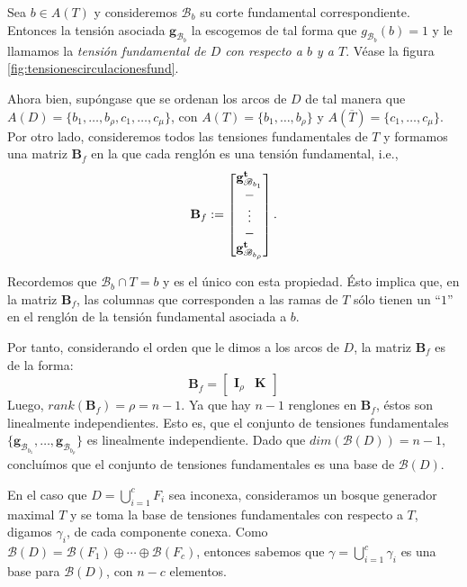 Sea $b \in A(T)$ y consideremos $\mathscr{B}_{b}$ su corte fundamental correspondiente. Entonces la tensión asociada $\mathbf{g}_{\mathscr{B}_{b}}$ la escogemos de tal forma que $g_{\mathscr{B}_{b}}(b) = 1$ y le llamamos la \textit{tensión fundamental de $D$ con respecto a $b$ y a $T$}. Véase la figura \ref{fig:tensionescirculacionesfund}.

Ahora bien, supóngase que se ordenan los arcos de $D$ de tal manera que $A(D) = \{b_{1}, \ldots, b_{\rho}, c_{1}, \ldots, c_{\mu}\}$, con $A(T) = \{b_{1}, \ldots, b_{\rho}\}$ y $A(\overline{T}) = \{c_{1}, \ldots, c_{\mu}\}$. Por otro lado, consideremos todos las tensiones fundamentales de $T$ y formamos una matriz $\mathbf{B}_{f}$ en la que cada renglón es una tensión fundamental, i.e., 
$$
\mathbf{B}_{f} := \begin{bmatrix}
\mathbf{g}_{\mathscr{B}_{b_{1}}}^{\mathbf{t}} \\
\-- \\
\vdots \\
\-- \\
\mathbf{g}_{\mathscr{B}_{b_{\rho}}}^{\mathbf{t}}
\end{bmatrix}.
$$

Recordemos que  $\mathscr{B}_{b} \cap T = b$ y es el único con esta propiedad. Ésto implica que, en la matriz $\mathbf{B}_{f}$, las columnas que corresponden a las ramas de $T$ sólo tienen un ``$1$'' en el renglón de la tensión fundamental asociada a $b$.  

Por tanto, considerando el orden que le dimos a los arcos de $D$, la matriz $\mathbf{B}_{f}$ es de la forma:
$$
\mathbf{B}_{f} = \begin{bmatrix}
\mathbf{I}_{\rho} & \mathbf{K} 
\end{bmatrix}
$$
Luego, $rank(\mathbf{B}_{f}) = \rho = n-1$. Ya que hay $n -1$ renglones en $\mathbf{B}_{f}$, éstos son linealmente independientes. Esto es, que el conjunto de tensiones fundamentales  $\{\mathbf{g}_{\mathscr{B}_{b_{1}}}, \ldots, \mathbf{g}_{\mathscr{B}_{b_{\rho}}} \}$ es linealmente independiente. Dado que $dim(\mathcal{B}(D)) = n -1$, concluímos que el conjunto de tensiones fundamentales es una base de $\mathcal{B}(D)$.

En el caso que $D = \bigcup_{i = 1}^{c} F_{i}$ sea inconexa, consideramos  un bosque generador maximal $T$ y se toma la base de tensiones fundamentales con respecto a $T$, digamos $\gamma_{i}$, de cada componente conexa. Como $\mathcal{B}(D) = \mathcal{B}(F_{1}) \oplus \cdots \oplus \mathcal{B}(F_{c})$, entonces sabemos que $\gamma = \bigcup_{i =1}^{c}\gamma_{i}$ es una base para $\mathcal{B}(D)$, con $n - c$ elementos.


